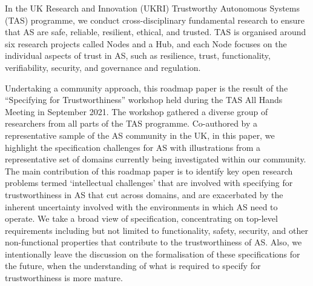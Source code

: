 \documentclass[sigconf,nonacm]{acmart}%
\begin{document}
%


	In the UK Research and Innovation (UKRI) Trustworthy Autonomous Systems (TAS) programme, we conduct cross-disciplinary fundamental research to ensure that AS are safe, reliable, resilient, ethical, and trusted. TAS is organised around six research projects called Nodes and a Hub, and each Node focuses on the individual aspects of trust in AS, such as resilience, trust, functionality, verifiability, security, and governance and regulation. 
	
	Undertaking a community approach, this roadmap paper is the result of the ``Specifying for Trustworthiness'' workshop held during the TAS All Hands Meeting in September 2021. The workshop gathered a diverse group of researchers from all parts of the TAS programme. 
	Co-authored by a representative sample of the AS community in the UK, in this paper, we highlight the specification challenges for AS with illustrations from a representative set of domains currently being investigated within our community. 
	The main contribution of this roadmap paper is to identify key open research problems termed `intellectual challenges' that are involved with specifying for trustworthiness in AS that cut across domains, and are exacerbated by the inherent uncertainty involved with the environments in which AS need to operate. 
	We take a broad view of specification, concentrating on top-level requirements including but not limited to functionality, safety, security, and other non-functional properties that contribute to the trustworthiness of AS. 
	Also, we intentionally leave the discussion on the formalisation of these specifications for the future, when the understanding of what is required to specify for trustworthiness is more mature. 
\end{document}
